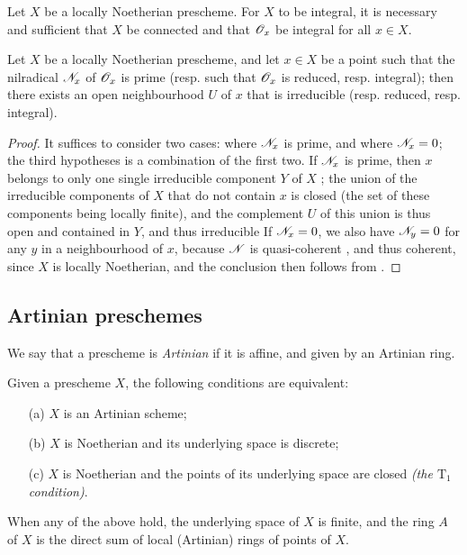\begin{corollary}[6.1.12]
\label{I.6.1.12}
Let $X$ be a locally Noetherian prescheme.
For $X$ to be integral, it is necessary and sufficient that $X$ be connected and that $\mathscr{O}_x$ be integral for all $x\in X$.
\end{corollary}

\begin{proposition}[6.1.13]
\label{I.6.1.13}
Let $X$ be a locally Noetherian prescheme, and let $x\in X$ be a point such that the nilradical $\mathscr{N}_x$ of $\mathscr{O}_x$ is prime (resp. such that $\mathscr{O}_x$ is reduced, resp. integral);
then there exists an open neighbourhood $U$ of $x$ that is irreducible (resp. reduced, resp. integral).
\end{proposition}

\begin{proof}
It suffices to consider two cases: where $\mathscr{N}_x$ is prime, and where $\mathscr{N}_x=0$; the third hypotheses is a combination of the first two.
If $\mathscr{N}_x$ is prime, then $x$ belongs to only one single irreducible component $Y$ of $X$ ;
the union of the irreducible components of $X$ that do not contain $x$ is closed (the set of these components being locally finite), and the complement $U$ of this union is thus open and contained in $Y$, and thus irreducible 
If $\mathscr{N}_x=0$, we also have $\mathscr{N}_y=0$ for any $y$ in a neighbourhood of $x$, because $\mathscr{N}$ is quasi-coherent , and thus coherent, since $X$ is locally Noetherian, and the conclusion then follows from .
\end{proof}

\subsection{Artinian preschemes}
\label{subsection:I.6.2}

\begin{definition}[6.2.1]
\label{I.6.2.1}
We say that a prescheme is \emph{Artinian} if it is affine, and given by an Artinian ring.
\end{definition}

\begin{proposition}[6.2.2]
\label{I.6.2.2}
Given
a prescheme $X$, the following conditions are equivalent:
\begin{enumerate}
  \item[{\rm(a)}] $X$ is an Artinian scheme;
  \item[{\rm(b)}] $X$ is Noetherian and its underlying space is discrete;
  \item[{\rm(c)}] $X$ is Noetherian and the points of its underlying space are closed \emph{(the $\mathrm{T}_1$ condition)}.
\end{enumerate}
When any of the above hold, the underlying space of $X$ is finite, and the ring $A$ of $X$ is the direct sum of local (Artinian) rings of points of $X$.
\end{proposition}

